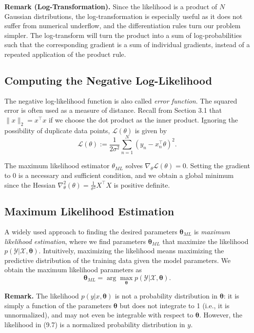 \documentclass[12pt,openany]{book}
\theoremstyle{definition}
\begin{document}
	\textbf{Remark (Log-Transformation).} Since the likelihood is a product of $N$ Gaussian distributions, the log-transformation is especially useful as it does not suffer from numerical underflow, and the differentiation rules turn our problem simpler. The log-transform will turn the product into a sum of log-probabilities such that the corresponding gradient is a sum of individual gradients, instead of a repeated application of the product rule.
	
	\subsection{Computing the Negative Log-Likelihood}
	The negative log-likelihood function is also called \textit{error function}. The squared error is often used as a measure of distance. Recall from Section 3.1 that $\lVert x \rVert_2 = x^\top x$ if we choose the dot product as the inner product. Ignoring the possibility of duplicate data points, $\mathcal{L}(\theta)$ is given by
	\begin{equation}
		\mathcal{L}(\theta) := \frac{1}{2\sigma^2} \sum_{n=1}^{N} (y_n - x_n^\top \theta)^2.
	\end{equation}
	
	The maximum likelihood estimator $\theta_{ML}$ solves $\nabla_{\theta} \mathcal{L}(\theta) = 0$. Setting the gradient to 0 is a necessary and sufficient condition, and we obtain a global minimum since the Hessian $\nabla^2_{\theta}(\theta) = \frac{1}{\sigma^2} X^\top X$ is positive definite.
	
	\subsection{Maximum Likelihood Estimation}
	A widely used approach to finding the desired parameters $\boldsymbol{\theta}_{ML}$ is \textit{maximum likelihood estimation}, where we find parameters $\boldsymbol{\theta}_{ML}$ that maximize the likelihood $p(\mathcal{Y} | \mathcal{X}, \boldsymbol{\theta})$. Intuitively, maximizing the likelihood means maximizing the predictive distribution of the training data given the model parameters. We obtain the maximum likelihood parameters as
	\begin{equation}
		\boldsymbol{\theta}_{ML} = \arg \max_{\boldsymbol{\theta}} p(\mathcal{Y} | \mathcal{X}, \boldsymbol{\theta}).
	\end{equation}
	
	\textbf{Remark.} The likelihood $p(y | x, \boldsymbol{\theta})$ is not a probability distribution in $\boldsymbol{\theta}$: it is simply a function of the parameters $\boldsymbol{\theta}$ but does not integrate to 1 (i.e., it is unnormalized), and may not even be integrable with respect to $\boldsymbol{\theta}$. However, the likelihood in (9.7) is a normalized probability distribution in $y$.
	
\end{document}
